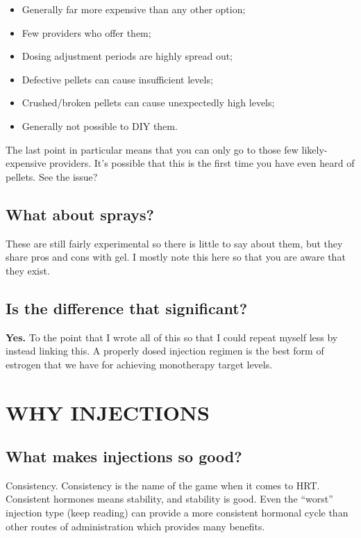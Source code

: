 \documentclass{article}
\begin{document}
\begin{itemize}
  \item Generally far more expensive than any other option;
  \item Few providers who offer them;
  \item Dosing adjustment periods are highly spread out;
  \item Defective pellets can cause insufficient levels;
  \item Crushed/broken pellets can cause unexpectedly high levels;
  \item Generally not possible to DIY them.
\end{itemize}

The last point in particular means that you can only go to those few likely-expensive providers. It’s possible that this is the first time you have even heard of pellets. See the issue?

\subsection{What about sprays?}

These are still fairly experimental so there is little to say about them, but they share pros and cons with gel. I mostly note this here so that you are aware that they exist.

\subsection{Is the difference that significant?}

\textbf{Yes.} To the point that I wrote all of this so that I could repeat myself less by instead linking this. A properly dosed injection regimen is the best form of estrogen that we have for achieving monotherapy target levels.

 

\section{WHY INJECTIONS}

\subsection{What makes injections so good?}

Consistency. Consistency is the name of the game when it comes to HRT. Consistent hormones means stability, and stability is good. Even the “worst” injection type (keep reading) can provide a more consistent hormonal cycle than other routes of administration which provides many benefits.
\end{document}
